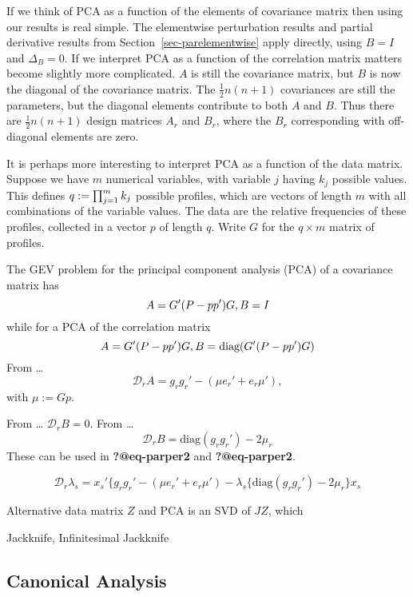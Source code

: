 \documentclass[
  12pt,
  letterpaper,
  DIV=11,
  numbers=noendperiod]{scrartcl}
\begin{document}
If we think of PCA as a function of the elements of covariance matrix
then using our results is real simple. The elementwise perturbation
results and partial derivative results from
Section~\ref{sec-parelementwise} apply directly, using \(B=I\) and
\(\Delta_B=0\). If we interpret PCA as a function of the correlation
matrix matters become slightly more complicated. \(A\) is still the
covariance matrix, but \(B\) is now the diagonal of the covariance
matrix. The \(\frac12n(n+1)\) covariances are still the parameters, but
the diagonal elements contribute to both \(A\) and \(B\). Thus there are
\(\frac12n(n+1)\) design matrices \(A_r\) and \(B_r\), where the \(B_r\)
corresponding with off-diagonal elements are zero.

It is perhaps more interesting to interpret PCA as a function of the
data matrix. Suppose we have \(m\) numerical variables, with variable
\(j\) having \(k_j\) possible values. This defines
\(q:=\smash{\prod_{j=1}^m k_j}\) possible profiles, which are vectors of
length \(m\) with all combinations of the variable values. The data are
the relative frequencies of these profiles, collected in a vector \(p\)
of length \(q\). Write \(G\) for the \(q\times m\) matrix of profiles.

The GEV problem for the principal component analysis (PCA) of a
covariance matrix has \[
A=G'(P-pp')G,\\
B=I
\] while for a PCA of the correlation matrix \[
A=G'(P-pp')G,\\
B=\text{diag}(G'(P-pp')G)
\] From \ldots{}\\
\[
\mathcal{D}_rA=g_rg_r'-(\mu e_r'+e_r\mu'),
\] with \(\mu:=Gp\).

From \ldots{} \(\mathcal{D}_rB=0\). From \ldots{} \[
\mathcal{D}_rB=\text{diag}(g_rg_r')-2\mu_r
\] These can be used in \textbf{?@eq-parper2} and \textbf{?@eq-parper2}.

\[
\mathcal{D}_r\lambda_s=
x_s'\{g_rg_r'-(\mu e_r'+e_r\mu')-\lambda_s\{\text{diag}(g_rg_r')-2\mu_r\}x_s
\]

Alternative data matrix \(Z\) and PCA is an SVD of \(JZ\), which

Jackknife, Infinitesimal Jackknife

\subsection{Canonical Analysis}\label{sec-canonical}
\end{document}
